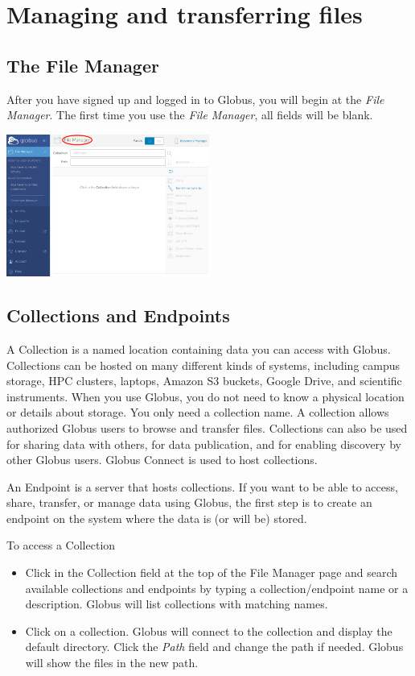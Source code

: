 \chapter{Managing and transferring files}

\section{The File Manager}\label{file-manager}

After you have signed up and logged in to Globus, you will begin at the \emph{File Manager}. The first time you use the \emph{File Manager}, all fields will be blank.

\begin{center}
\includegraphics[width=0.5\textwidth]{img/filemanager-1.png}
\end{center}

\section{Collections and Endpoints}\label{collections-endpoints}

A \gls{Collection} is a named location containing data you can access with Globus. Collections can be hosted on many different kinds of systems, including campus storage, HPC clusters, laptops, Amazon S3 buckets, Google Drive, and scientific instruments. When you use Globus, you do not need to know a physical location or details about storage. You only need a collection name. A collection allows authorized Globus users to browse and transfer files. Collections can also be used for sharing data with others, for data publication, and for enabling discovery by other Globus users. \gls{Globus Connect} is used to host collections.

An \gls{Endpoint} is a server that hosts collections. If you want to be able to access, share, transfer, or manage data using Globus, the first step is to create an endpoint on the system where the data is (or will be) stored.

To access a Collection
\begin{itemize}
\item Click in the \gls{Collection} field at the top of the File Manager page and search available collections and endpoints by typing a collection/endpoint name or a description. Globus will list collections with matching names.
\item Click on a collection. Globus will connect to the collection and display the default directory. Click the \emph{Path} field and change the path if needed. Globus will show the files in the new path.
\end{itemize}


